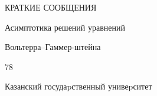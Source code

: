 \bigskip


\par





\centerline{КРАТКИЕ СООБЩЕНИЯ}


\bigskip







{Асимптотика решений уравнений


Вольтерра--Гаммер-\newline штейна}{78}








\vfill


\noindent\raisebox{2pt}{\copyright} Казанский госудаpственный унивеpситет





